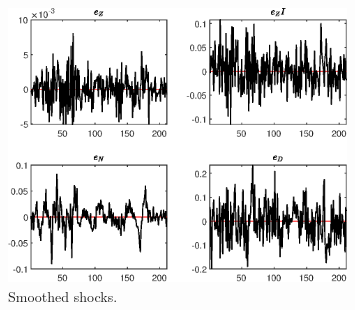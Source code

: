  
\begin{figure}[H]
\centering 
\includegraphics[width=0.80\textwidth]{BRS_comovement/graphs/BRS_comovement_SmoothedShocks1}
\caption{Smoothed shocks.}\label{Fig:SmoothedShocks:1}
\end{figure}


